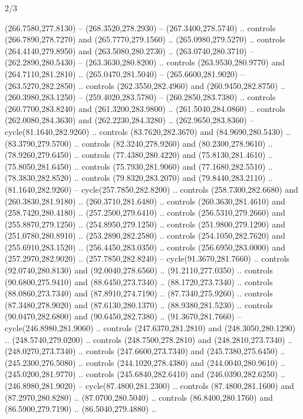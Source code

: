 \begin{flagdescription}{2/3}
\begin{scope}[xshift=0.5\flaglength,yshift=0.5\flagwidth,scale=\stretchfactor]
\begin{scope}[scale=0.001645\flagwidth,yshift=65mm,xshift=-63mm]
\begin{scope}[y=0.80pt, x=0.80pt, yscale=-1,]
\begin{scope}[cm={{1.33333,0.0,0.0,1.33333,(0.0,1e-05)}}]
  (266.7580,277.8130) -- (268.3520,278.2930) -- (267.3400,278.5740) .. controls
  (266.7890,278.7270) and (265.7770,279.1560) .. (265.0980,279.5270) .. controls
  (264.4140,279.8950) and (263.5080,280.2730) .. (263.0740,280.3710) --
  (262.2890,280.5430) -- (263.3630,280.8200) .. controls (263.9530,280.9770) and
  (264.7110,281.2810) .. (265.0470,281.5040) -- (265.6600,281.9020) --
  (263.5270,282.2850) .. controls (262.3550,282.4960) and (260.9450,282.8750) ..
  (260.3980,283.1250) -- (259.4020,283.5780) -- (260.2850,283.7380) .. controls
  (260.7700,283.8240) and (261.3200,283.9800) .. (261.5040,284.0860) .. controls
  (262.0080,284.3630) and (262.2230,284.3280) .. (262.9650,283.8360) --
  cycle(81.1640,282.9260) .. controls (83.7620,282.3670) and (84.9690,280.5430)
  .. (83.3790,279.5700) .. controls (82.3240,278.9260) and (80.2300,278.9610) ..
  (78.9260,279.6450) .. controls (77.4380,280.4220) and (75.8130,281.4610) ..
  (75.8050,281.6450) .. controls (75.7930,281.9060) and (77.1680,282.5510) ..
  (78.3830,282.8520) .. controls (79.8320,283.2070) and (79.8440,283.2110) ..
  (81.1640,282.9260) -- cycle(257.7850,282.8200) .. controls (258.7300,282.6680)
  and (260.3830,281.9180) .. (260.3710,281.6480) .. controls (260.3630,281.4610)
  and (258.7420,280.4180) .. (257.2500,279.6410) .. controls (256.5310,279.2660)
  and (255.8870,279.1250) .. (254.8950,279.1250) .. controls (251.9800,279.1290)
  and (251.0780,280.8910) .. (253.2890,282.2580) .. controls (254.1050,282.7620)
  and (255.6910,283.1520) .. (256.4450,283.0350) .. controls (256.6950,283.0000)
  and (257.2970,282.9020) .. (257.7850,282.8240) -- cycle(91.3670,281.7660) ..
  controls (92.0740,280.8130) and (92.0040,278.6560) .. (91.2110,277.0350) ..
  controls (90.6800,275.9410) and (88.6450,273.7340) .. (88.1720,273.7340) ..
  controls (88.0860,273.7340) and (87.8910,274.7190) .. (87.7340,275.9260) ..
  controls (87.3480,278.9020) and (87.6130,280.1370) .. (88.9380,281.5230) ..
  controls (90.0470,282.6800) and (90.6450,282.7380) .. (91.3670,281.7660) --
  cycle(246.8980,281.9060) .. controls (247.6370,281.2810) and
  (248.3050,280.1290) .. (248.5740,279.0200) .. controls (248.7500,278.2810) and
  (248.2810,273.7340) .. (248.0270,273.7340) .. controls (247.6600,273.7340) and
  (245.7380,275.6450) .. (245.2300,276.5080) .. controls (244.1020,278.4380) and
  (244.0040,280.9610) .. (245.0200,281.9770) .. controls (245.6840,282.6410) and
  (246.0390,282.6250) .. (246.8980,281.9020) -- cycle(87.4800,281.2300) ..
  controls (87.4800,281.1600) and (87.2970,280.8280) .. (87.0700,280.5040) ..
  controls (86.8400,280.1760) and (86.5900,279.7190) .. (86.5040,279.4880) ..

\end{scope}
\end{scope}
\end{scope}
\end{scope}
\end{flagdescription}
